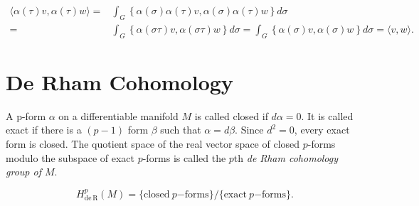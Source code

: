 \begin{align*}\langle\alpha(\tau)v,\alpha(\tau)w\rangle=&\int_{G}\left\{\alpha(\sigma)\alpha(\tau)v,\alpha(\sigma)\alpha(\tau)w\right\}d\sigma\\=&\int_{G}\left\{\alpha(\sigma\tau)v,\alpha(\sigma\tau)w\right\}d\sigma=\int_{G}\left\{\alpha(\sigma)v,\alpha(\sigma)w\right\}d\sigma=\langle v,w\rangle.\end{align*}


\section{De Rham Cohomology}


\begin{definition}\label{thm:4.13}
A p-form $\alpha$ on a differentiable manifold $M$ is called closed if $d\alpha = 0$. It is called exact if there is a $(p - 1)$ form $\beta$ such that $\alpha = d\beta$. Since $d^{2} = 0$, every exact form is closed. The quotient space of the real vector space of closed $p$-forms modulo the subspace of exact $p$-forms is called the $p$th \emph{de Rham cohomology group of $M$}. 

\begin{equation}
\tag{1}\label{eq:4.13:1}
H_{\mathrm{de\,R}}^{p}(M)=\{\mathrm{closed}~p\mathrm{-forms}\}/\{\mathrm{exact}~p\mathrm{-forms}\}.
\end{equation}

\end{definition}

